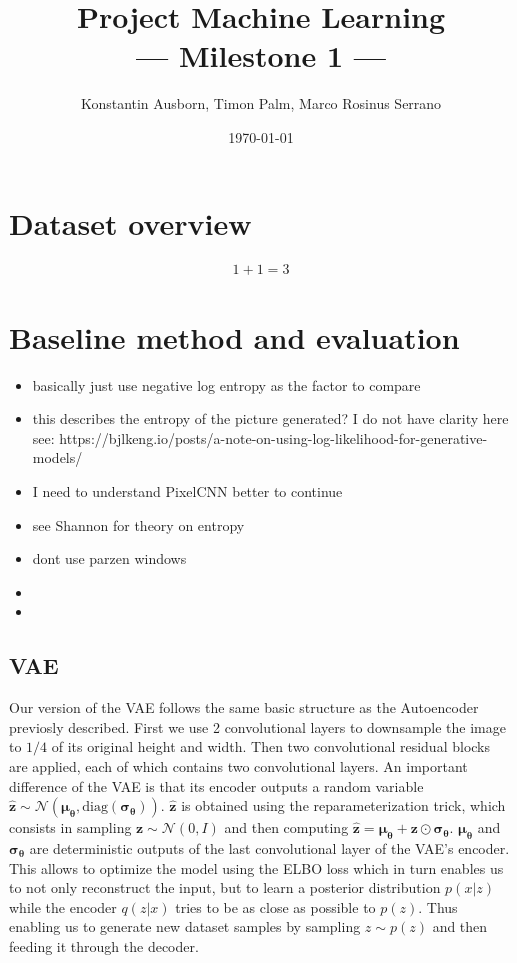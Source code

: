 \documentclass[10pt,a4paper,twoside]{article}
\title{Project Machine Learning\\--- Milestone 1 ---}
\author{Konstantin Ausborn, Timon Palm, Marco Rosinus Serrano}
\date{\today}
\begin{document}
\maketitle

\section{Dataset overview}
    \begin{align}
        1 + 1 = 3
    \end{align}

\section{Baseline method and evaluation}

\begin{itemize}
    \item basically just use negative log entropy as the factor to compare
    \item this describes the entropy of the picture generated?
    I do not have clarity here see: https://bjlkeng.io/posts/a-note-on-using-log-likelihood-for-generative-models/
    \item I need to understand PixelCNN better to continue
    \item see Shannon for theory on entropy\cite{shannon}
    \item dont use parzen windows\cite{note_on_eval}
    \item
    \item
\end{itemize}

\subsection{VAE}

Our version of the VAE follows the same basic structure as the Autoencoder
previosly described. First we use 2 convolutional layers to downsample the
image to $1/4$ of its original height and width. Then two convolutional
residual blocks are applied, each of which contains two convolutional layers.
An important difference of the VAE is that its encoder outputs a random
variable $\boldsymbol{\hat{z}} \sim \mathcal{N}(\boldsymbol{\mu_\theta}, \text{diag}
(\boldsymbol{\sigma_\theta}))$. $\boldsymbol{\hat{z}}$ is obtained using the
reparameterization trick, which consists in sampling $\boldsymbol{z}
\sim \mathcal{N}(0, I)$ and then computing $\boldsymbol{\hat{z}} =
\boldsymbol{\mu_\theta} + \boldsymbol{z} \odot \boldsymbol{\sigma_\theta}$.
$\boldsymbol{\mu_\theta}$ and $\boldsymbol{\sigma_\theta}$ are deterministic
outputs of the last convolutional layer of the VAE's encoder. This allows to
optimize the model using the ELBO loss which in turn enables us to not only
reconstruct the input, but to learn a posterior distribution $p(x|z)$ while
the encoder $q(z|x)$ tries to be as close as possible to $p(z)$. Thus enabling
us to generate new dataset samples by sampling $z \sim p(z)$ and then feeding
it through the decoder.
\end{document}
